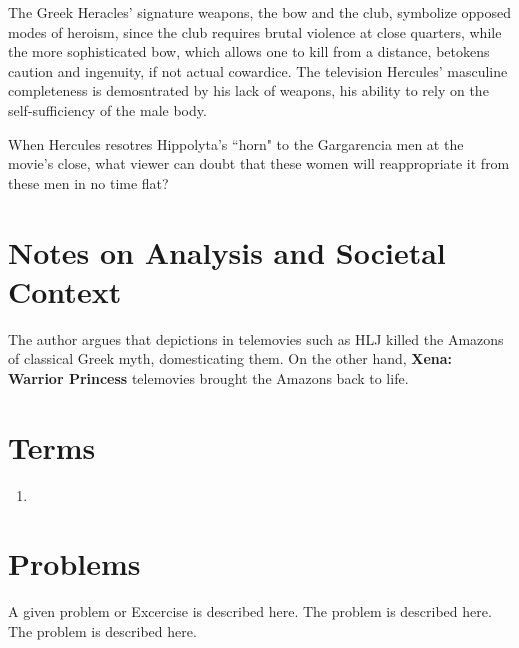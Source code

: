 The Greek Heracles' signature weapons, the bow and the club, symbolize opposed modes of heroism, since the club requires brutal violence at close quarters, while the more sophisticated bow, which allows one to kill from a distance, betokens caution and ingenuity, if not actual cowardice. The television Hercules' masculine completeness is demosntrated by his lack of weapons, his ability to rely on the self-sufficiency of the male body.


When Hercules resotres Hippolyta's ``horn" to the Gargarencia men at the movie's close, what viewer can doubt that these women will reappropriate it from these men in no time flat?


\section{Notes on Analysis and Societal Context}
\label{sec:SocCont7}

\begin{rmk}
    The author argues that depictions in telemovies such as HLJ killed the Amazons of classical Greek myth, domesticating them. On the other hand, \textbf{Xena: Warrior Princess} telemovies brought the Amazons back to life.
\end{rmk}




\section{Terms}
\label{sec:terms7}

\begin{enumerate}
	\item
\end{enumerate}

%
%
%


\section*{Problems}
%
\begin{prob}
\label{prob1}
A given problem or Excercise is described here. The
problem is described here. The problem is described here.
\end{prob}




